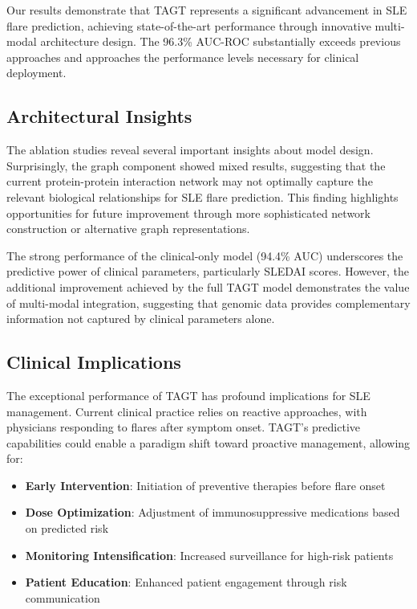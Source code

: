 \documentclass[conference]{IEEEtran}
\begin{document}
Our results demonstrate that TAGT represents a significant advancement in SLE flare prediction, achieving state-of-the-art performance through innovative multi-modal architecture design. The 96.3\% AUC-ROC substantially exceeds previous approaches and approaches the performance levels necessary for clinical deployment.

\subsection{Architectural Insights}

The ablation studies reveal several important insights about model design. Surprisingly, the graph component showed mixed results, suggesting that the current protein-protein interaction network may not optimally capture the relevant biological relationships for SLE flare prediction. This finding highlights opportunities for future improvement through more sophisticated network construction or alternative graph representations.

The strong performance of the clinical-only model (94.4\% AUC) underscores the predictive power of clinical parameters, particularly SLEDAI scores. However, the additional improvement achieved by the full TAGT model demonstrates the value of multi-modal integration, suggesting that genomic data provides complementary information not captured by clinical parameters alone.

\subsection{Clinical Implications}

The exceptional performance of TAGT has profound implications for SLE management. Current clinical practice relies on reactive approaches, with physicians responding to flares after symptom onset. TAGT's predictive capabilities could enable a paradigm shift toward proactive management, allowing for:

\begin{itemize}
\item \textbf{Early Intervention}: Initiation of preventive therapies before flare onset
\item \textbf{Dose Optimization}: Adjustment of immunosuppressive medications based on predicted risk
\item \textbf{Monitoring Intensification}: Increased surveillance for high-risk patients
\item \textbf{Patient Education}: Enhanced patient engagement through risk communication
\end{itemize}
\end{document}
